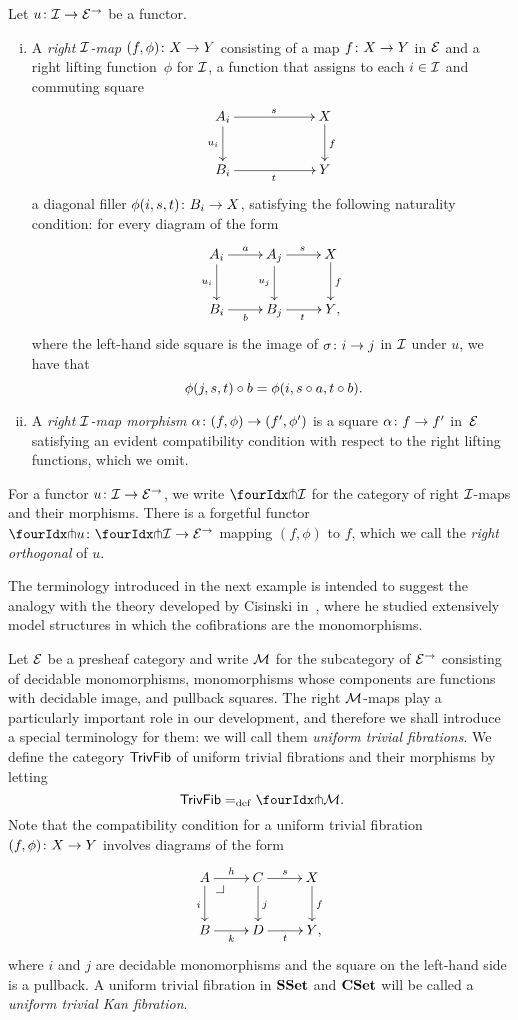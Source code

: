 \documentclass[reqno,10pt,a4paper,oneside,draft]{amsart}
\begin{document}
\begin{definition} \label{def:right-map}
Let $u \co \cal{I} \to \catE^\to$ be a functor.
\begin{enumerate}[(i)]
\item A \emph{right $\cal{I}$-map} $(f, \phi) \co X \to Y$ consisting of a map $f \co X \to Y$ in $\catE$ and a right lifting function~$\phi$ for $\cal{I}$, \ie a function that assigns to each $i \in \cal{I}$ and commuting square
\[
\xymatrix@C=2cm{
A_i \ar[r]^{s} \ar[d]_{u_i} & X \ar[d]^f \\
B_i \ar[r]_{t} & Y}
\]
a diagonal filler $\phi(i,s, t) \co B_i \to X$, satisfying the following naturality condition: for every diagram of the form
\[
\xymatrix{
A_i \ar[r]^a \ar[d]_{u_i} & A_j \ar[r]^{s} \ar[d]_{u_j} & X \ar[d]^f \\
B_i \ar[r]_{b} & B_j \ar[r]_{t} & Y \rlap{,}}
\]
where the left-hand side square is the image of $\sigma \co i \to j$ in $\cal{I}$ under $u$, we have that
\[
\phi(j, s, t) \cc b = \phi(i, s \cc a, t \cc b) \rlap{.}
\]
\item A \emph{right $\cal{I}$-map morphism} $\alpha \co (f, \phi) \to (f', \phi')$ is a square $\alpha \co f \to f'$ in~$\catE$ satisfying an evident compatibility condition with respect to the right lifting functions, which we omit.
\end{enumerate}
\end{definition}

For a functor $u \co \cal{I} \to \catE^\to$, we write $\liftr{\cal{I}}$ for the category of right $\cal{I}$-maps and their morphisms.
There is a forgetful functor~$\liftr{u} \co \liftr{\cal{I}} \to \catE^\to$ mapping $(f, \phi)$ to $f$, which we call the \emph{right orthogonal} of $u$.

The terminology introduced in the next example is intended to suggest the analogy with the theory developed by Cisinski in~\cite{cisinski-asterisque}, where he studied extensively model structures in which the cofibrations are the monomorphisms.

\begin{example} \label{exa-triv-kan-fib}
Let $\catE$ be a presheaf category and write $\cal{M}$ for the subcategory of $\catE^\to$ consisting of decidable monomorphisms, \ie monomorphisms whose components are functions with decidable image, and pullback squares.
The right $\cal{M}$-maps play a particularly important role in our development, and therefore we shall introduce a special terminology for them: we will call them \emph{uniform trivial fibrations}.
We define the category $\TrivFib$ of uniform trivial fibrations and their morphisms by letting
\[
 \TrivFib \defeq \liftr{\cal{M}} \rlap{.}
\]
Note that the compatibility condition for a uniform trivial fibration $(f, \phi) \co X \to Y$ involves diagrams of the form
\[
\xymatrix{
A \ar[r]^{h} \ar[d]_{i} \pullback{dr} & C \ar[d]^{j} \ar[r]^s & X \ar[d]^f \\
B \ar[r]_{k} & D \ar[r]_t & Y \rlap{,}}
\]
where $i$ and $j$ are decidable monomorphisms and the square on the left-hand side is a pullback.
A uniform trivial fibration in $\SSet$ and $\CSet$ will be called a \emph{uniform trivial Kan fibration}.
\end{example}
\end{document}
